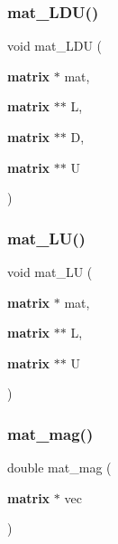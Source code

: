 \mbox{\label{mat_lib_8h_a77f5a35f740e744a3ac8c42f51f1c79d}} 
\subsubsection{mat\+\_\+\+L\+D\+U()}
{\footnotesize\ttfamily void mat\+\_\+\+L\+DU (\begin{DoxyParamCaption}\item[{\textbf{ matrix} $\ast$}]{mat,  }\item[{\textbf{ matrix} $\ast$$\ast$}]{L,  }\item[{\textbf{ matrix} $\ast$$\ast$}]{D,  }\item[{\textbf{ matrix} $\ast$$\ast$}]{U }\end{DoxyParamCaption})}

\mbox{\label{mat_lib_8h_ae0710b7d34530ede38c21586fc2adeb4}} 
\subsubsection{mat\+\_\+\+L\+U()}
{\footnotesize\ttfamily void mat\+\_\+\+LU (\begin{DoxyParamCaption}\item[{\textbf{ matrix} $\ast$}]{mat,  }\item[{\textbf{ matrix} $\ast$$\ast$}]{L,  }\item[{\textbf{ matrix} $\ast$$\ast$}]{U }\end{DoxyParamCaption})}

\mbox{\label{mat_lib_8h_aa23543931c2dff9f4bf711e69a064816}} 
\subsubsection{mat\+\_\+mag()}
{\footnotesize\ttfamily double mat\+\_\+mag (\begin{DoxyParamCaption}\item[{\textbf{ matrix} $\ast$}]{vec }\end{DoxyParamCaption})}

\mbox{\label{mat_lib_8h_ad3af61de70e86a8155629e9eeb9f36c2}} 
